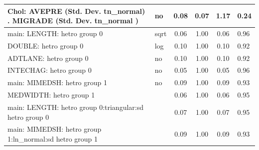 \begin{table}
\begin{center}
\begin{tabular}{|l|l|c|c|c|l|}
			\hline
			 Chol: AVEPRE (Std. Dev. tn_normal) . MIGRADE (Std. Dev.   tn_normal ) & no & 0.08 & 0.07 & 1.17 & 0.24 \\
			\hline
			main: LENGTH: hetro group 0 & sqrt & 0.06 & 1.00 & 0.06 & 0.96 \\
			\hline
			DOUBLE: hetro group 0 & log & 0.10 & 1.00 & 0.10 & 0.92 \\
			\hline
			ADTLANE: hetro group 0 & no & 0.10 & 1.00 & 0.10 & 0.92 \\
			\hline
			INTECHAG: hetro group 0 & no & 0.05 & 1.00 & 0.05 & 0.96 \\
			\hline
			main: MIMEDSH: hetro group 1 & no & 0.09 & 1.00 & 0.09 & 0.93 \\
			\hline
			MEDWIDTH: hetro group 1 &  & 0.06 & 1.00 & 0.06 & 0.95 \\
			\hline
			main: LENGTH: hetro group 0:triangular:sd  hetro group 0 &  & 0.07 & 1.00 & 0.07 & 0.95 \\
			\hline
			main: MIMEDSH: hetro group 1:ln_normal:sd  hetro group 1 &  & 0.09 & 1.00 & 0.09 & 0.93 \\
			\hline
		\end{tabular}
	\end{center}
\end{table}